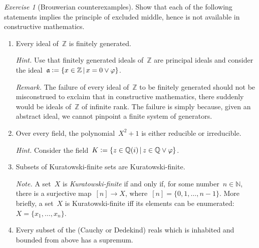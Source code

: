 \documentclass[10pt,reqno,a4paper,openany]{amsbook}
\theoremstyle{definition}
\theoremstyle{plain}
\theoremstyle{remark}
\newcommand{\ZZ}{\mathbb{Z}}
\newcommand{\NN}{\mathbb{N}}
\newcommand{\QQ}{\mathbb{Q}}
\newcommand{\aaa}{\mathfrak{a}}
\newcommand{\?}{\,{:}\,}
\renewcommand{\_}{\mathpunct{.}\,}
\newcommand{\defeq}{\vcentcolon=}
\newtheorem{exercise}{Exercise}[chapter]
\begin{document}
\begin{exercise}[Brouwerian counterexamples]
Show that each of the following statements implies the principle of excluded middle,
hence is not available in constructive mathematics.
\begin{enumerate}
\item Every ideal of~$\ZZ$ is finitely generated.

{\noindent\scriptsize\emph{Hint.} Use that finitely generated ideals of~$\ZZ$
are principal ideals and consider the ideal~$\aaa \defeq \{ x \in \ZZ
\,|\, x = 0 \vee \varphi \}$.\par}

{\noindent\scriptsize\emph{Remark.} The failure of every ideal of~$\ZZ$ to be
finitely generated should not be misconstrued to exclaim that in constructive
mathematics, there suddenly would be ideals of~$\ZZ$ of infinite rank. The
failure is simply because, given an abstract ideal, we cannot pinpoint a finite
system of generators.\par}

\item Over every field, the polynomial~$X^2 + 1$ is either reducible or
irreducible.

{\noindent\scriptsize\emph{Hint.} Consider the field~$K \defeq \{ z \in \QQ(i)
\,|\, z \in \QQ \vee \varphi \}$.\par}

\item Subsets of Kuratowski-finite sets are Kuratowski-finite.

{\noindent\scriptsize\emph{Note.} A set~$X$ is \emph{Kuratowski-finite} if and
only if, for some number~$n \in \NN$, there is a surjective map~$[n] \to X$,
where~$[n] = \{ 0,1,\ldots,n-1 \}$. More briefly, a set~$X$ is
Kuratowski-finite iff its elements can be enumerated: $X = \{x_1,\ldots,x_n \}$.\par}

\item Every subset of the (Cauchy or Dedekind) reals which is inhabited and
bounded from above has a supremum.


\end{enumerate}
\end{exercise}
\end{document}
